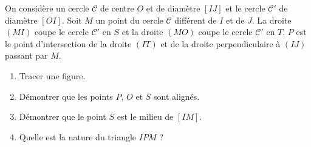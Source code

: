 
On considère un cercle $\mathscr{C}$ de centre $O$ et de diamètre $[IJ]$ et le cercle $\mathscr{C}'$ de diamètre $[OI]$.
Soit $M$ un point du cercle $\mathscr{C}$ différent de $I$ et de $J$. La droite $(MI)$ coupe le cercle $\mathscr{C}'$ en $S$ et la droite $(MO)$ coupe le cercle $\mathscr{C}'$ en $T$. $P$ est le point d'intersection de la droite $(IT)$ et de la droite perpendiculaire à $(IJ)$ passant par $M$.
\begin{enumerate}
 \item Tracer une figure.
 \item Démontrer que les points $P$, $O$ et $S$ sont alignés.
 \item Démontrer que le point $S$ est le milieu de $[IM]$. 
 \item Quelle est la nature du triangle $IPM$ ?  
\end{enumerate} 